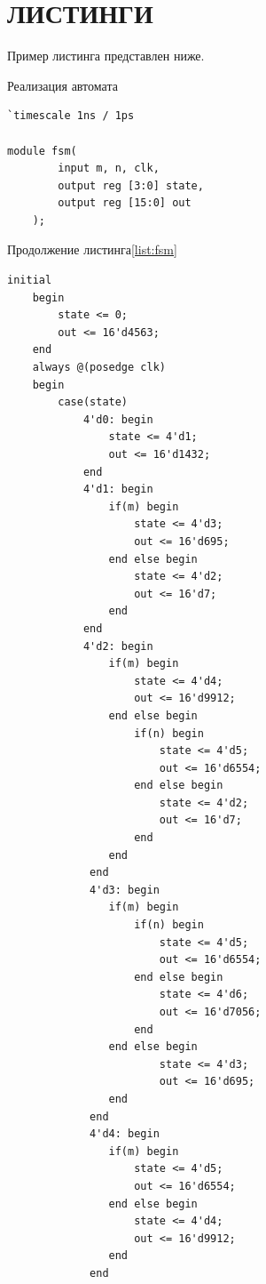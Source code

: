 \documentclass[14pt, a4paper]{extarticle}
\begin{document}
\section{ЛИСТИНГИ}

Пример листинга представлен ниже.

\begin{listing}[H]
\caption{Реализация автомата\label{list:fsm}}
\begin{Verbatim}[frame=single, fontsize=\footnotesize]
`timescale 1ns / 1ps

module fsm(
        input m, n, clk, 
        output reg [3:0] state,
        output reg [15:0] out
    );
\end{Verbatim}
\end{listing}
\begin{listing}[H]
\caption*{Продолжение листинга\;\ref{list:fsm}}
\begin{Verbatim}[frame=single, fontsize=\footnotesize]
    initial
    begin
        state <= 0;
        out <= 16'd4563;
    end
    always @(posedge clk)
    begin
        case(state)
            4'd0: begin
                state <= 4'd1;
                out <= 16'd1432;
            end
            4'd1: begin
                if(m) begin
                    state <= 4'd3;
                    out <= 16'd695;
                end else begin
                    state <= 4'd2;
                    out <= 16'd7;
                end
            end
            4'd2: begin
                if(m) begin
                    state <= 4'd4;
                    out <= 16'd9912;
                end else begin
                    if(n) begin
                        state <= 4'd5;
                        out <= 16'd6554;
                    end else begin
                        state <= 4'd2;
                        out <= 16'd7;
                    end
                end
             end
             4'd3: begin
                if(m) begin
                    if(n) begin
                        state <= 4'd5;
                        out <= 16'd6554;
                    end else begin
                        state <= 4'd6;
                        out <= 16'd7056;
                    end
                end else begin
                        state <= 4'd3;
                        out <= 16'd695;
                end
             end
             4'd4: begin
                if(m) begin
                    state <= 4'd5;
                    out <= 16'd6554;
                end else begin
                    state <= 4'd4;
                    out <= 16'd9912;
                end
             end
\end{Verbatim}
\end{listing}
\end{document}
